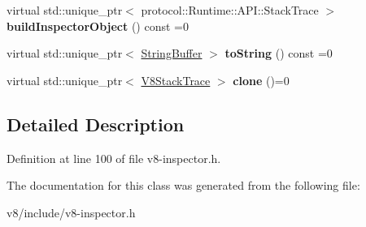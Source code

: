 \begin{DoxyCompactItemize}
virtual std\+::unique\+\_\+ptr$<$ protocol\+::\+Runtime\+::\+A\+P\+I\+::\+Stack\+Trace $>$ {\bfseries build\+Inspector\+Object} () const =0
\item 
\mbox{\label{classv8__inspector_1_1V8StackTrace_a05bb91a501d40686481c4971b4dee7f9}} 
virtual std\+::unique\+\_\+ptr$<$ \mbox{\hyperlink{classv8__inspector_1_1StringBuffer}{String\+Buffer}} $>$ {\bfseries to\+String} () const =0
\item 
\mbox{\label{classv8__inspector_1_1V8StackTrace_a5d03e8bfb799b8ced2bfd5c31615d64a}} 
virtual std\+::unique\+\_\+ptr$<$ \mbox{\hyperlink{classv8__inspector_1_1V8StackTrace}{V8\+Stack\+Trace}} $>$ {\bfseries clone} ()=0
\end{DoxyCompactItemize}


\subsection{Detailed Description}


Definition at line 100 of file v8-\/inspector.\+h.



The documentation for this class was generated from the following file\+:\begin{DoxyCompactItemize}
\item 
v8/include/v8-\/inspector.\+h\end{DoxyCompactItemize}
